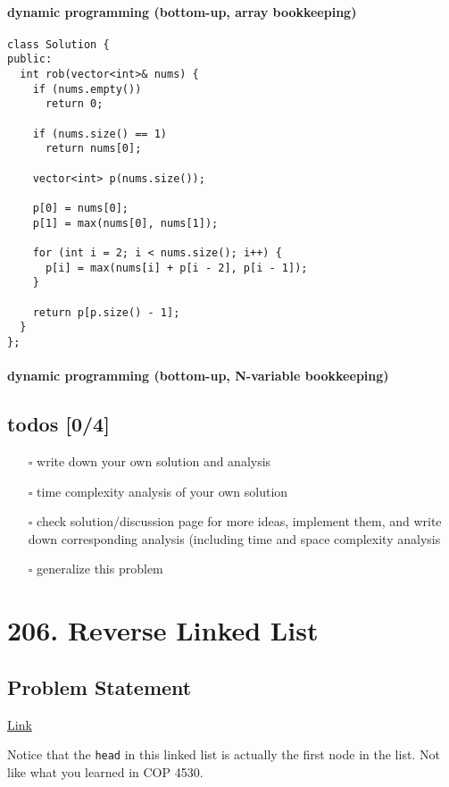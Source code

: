 \documentclass[12pt]{article}
\begin{document}
\paragraph{dynamic programming (bottom-up, array bookkeeping)}
\label{sec:org752885e}
\begin{verbatim}
class Solution {
public:  
  int rob(vector<int>& nums) {
    if (nums.empty())
      return 0;

    if (nums.size() == 1)
      return nums[0];

    vector<int> p(nums.size());

    p[0] = nums[0];
    p[1] = max(nums[0], nums[1]);

    for (int i = 2; i < nums.size(); i++) {
      p[i] = max(nums[i] + p[i - 2], p[i - 1]);
    }

    return p[p.size() - 1];
  }
};
\end{verbatim}
\paragraph{dynamic programming (bottom-up, N-variable bookkeeping)}
\label{sec:org5e57d66}
\subsection{todos [0/4]}
\label{sec:orge417e10}
\begin{itemize}
\item[{$\square$}] write down your own solution and analysis
\item[{$\square$}] time complexity analysis of your own solution
\item[{$\square$}] check solution/discussion page for more ideas, implement them, and write down corresponding analysis (including time and space complexity analysis
\item[{$\square$}] generalize this problem
\end{itemize}
\section{206. Reverse Linked List}
\label{sec:orgbb7f084}
\subsection{Problem Statement}
\label{sec:org66efa6e}
\href{https://leetcode.com/problems/reverse-linked-list/}{Link}

Notice that the \texttt{head} in this linked list is actually the first node in the list. Not like what you learned in COP 4530.
\end{document}
